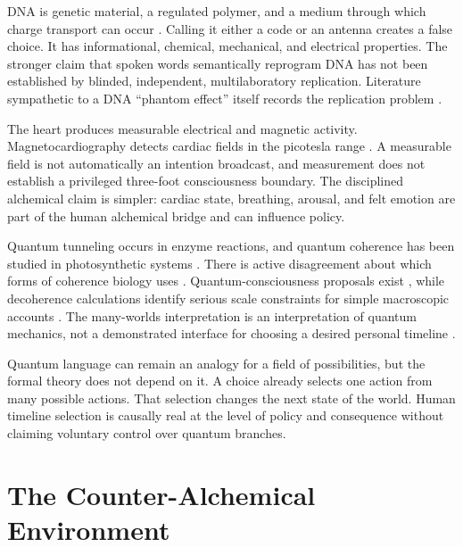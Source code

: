 \documentclass[11pt]{article}
\theoremstyle{plain}
\theoremstyle{definition}
\begin{document}
DNA is genetic material, a regulated polymer, and a medium through which charge
transport can occur \citep{crick1970central,virolainen2023geneenvironment,
zwang2018dnacharge}. Calling it either a code or an antenna creates a false choice. It
has informational, chemical, mechanical, and electrical properties. The stronger
claim that spoken words semantically reprogram DNA has not been established by
blinded, independent, multilaboratory replication. Literature sympathetic to a DNA
``phantom effect'' itself records the replication problem
\citep{gariaev2011wavegenetics,brill2012phantom}.

The heart produces measurable electrical and magnetic activity.
Magnetocardiography detects cardiac fields in the picotesla range
\citep{roth2024magnetocardiogram}. A measurable field is not automatically an
intention broadcast, and measurement does not establish a privileged three-foot
consciousness boundary. The disciplined alchemical claim is simpler: cardiac state,
breathing, arousal, and felt emotion are part of the human alchemical bridge and can
influence policy.

Quantum tunneling occurs in enzyme reactions, and quantum coherence has been studied
in photosynthetic systems \citep{cha1989tunneling,panitchayangkoon2010coherence}.
There is active disagreement about which forms of coherence biology uses
\citep{duan2017nolongcoherence}. Quantum-consciousness proposals exist
\citep{hameroff2014orch}, while decoherence calculations identify serious scale
constraints for simple macroscopic accounts \citep{tegmark2000decoherence}. The
many-worlds interpretation is an interpretation of quantum mechanics, not a
demonstrated interface for choosing a desired personal timeline
\citep{vaidman2022manyworlds}.

Quantum language can remain an analogy for a field of possibilities, but the formal
theory does not depend on it. A choice already selects one action from many possible
actions. That selection changes the next state of the world. Human timeline selection
is causally real at the level of policy and consequence without claiming voluntary
control over quantum branches.

\section{The Counter-Alchemical Environment}
\end{document}
